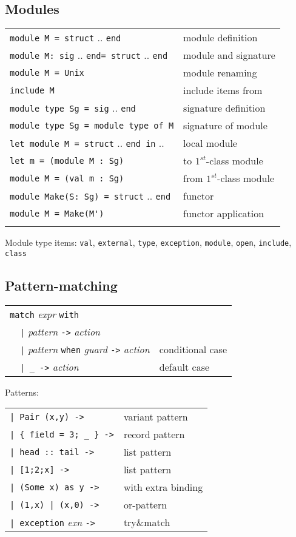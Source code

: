 \documentclass[10pt,landscape]{article}
\begin{document}
\begin{multicols}{3}
{\subsection{Modules}

\begin{tabular}{ll}
\Verb!module M = struct! .. \Verb!end! & module definition\\
\Verb!module M: sig! .. \Verb!end= struct! .. \Verb!end! & module and signature\\
\Verb!module M = Unix! & module renaming \\
\Verb!include M! & include items from \\
\Verb!module type Sg = sig! .. \Verb!end! & signature definition\\
\Verb!module type Sg = module type of M! & signature of module\\
\Verb!let module M = struct! .. \Verb!end in! ..  & local module \\
\Verb!let m = (module M : Sg)! & to $1^{st}$-class module\\
\Verb!module M = (val m : Sg)! & from $1^{st}$-class module\\
\Verb!module Make(S: Sg) = struct! .. \Verb!end! & functor \\
\Verb!module M = Make(M')! & functor application \\
& \\
\end{tabular}

Module type items: \Verb!val!, \Verb!external!, \Verb!type!, \Verb!exception!, \Verb!module!, \Verb!open!, \Verb!include!, \Verb!class!

\subsection{Pattern-matching}

\begin{tabular}{ll}
\Verb!match! \emph{expr} \Verb!with! \\
\Verb!  |! \emph{pattern} \Verb!->! \emph{action}\\
\Verb!  |! \emph{pattern} \Verb!when! \emph{guard} \Verb!->! \emph{action}
& conditional case \\
\Verb!  | _ ->! \emph{action} & default case\\
\end{tabular}
Patterns:\\
\begin{tabular}{ll}
\Verb!| Pair (x,y) ->! & variant pattern \\
\Verb!| { field = 3; _ } ->! & record pattern \\
\Verb!| head :: tail ->! & list pattern \\
\Verb!| [1;2;x] ->! & list pattern \\
\Verb!| (Some x) as y ->! & with extra binding \\
\Verb!| (1,x) | (x,0) ->! & or-pattern \\
\Verb!| exception! \emph{exn} \Verb!->! & try\&match \\
\end{tabular}
}


\end{multicols}
\end{document}
